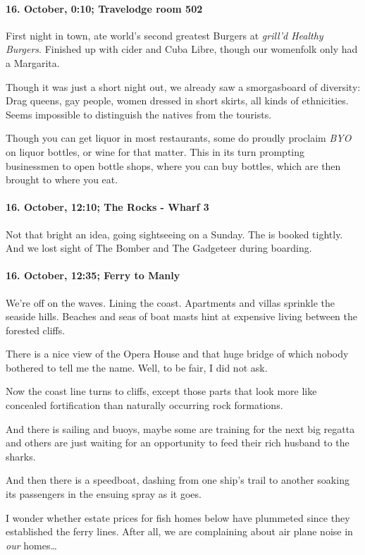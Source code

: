 \paragraph{16. October, 0:10; Travelodge room 502}
First night in town, ate world's second greatest Burgers at \emph{grill'd Healthy Burgers}.
Finished up with cider and Cuba Libre, though our womenfolk only had a Margarita.

Though it was just a short night out, we already saw a smorgasboard of diversity:
Drag queens, gay people, women dressed in short skirts, all kinds of ethnicities.
Seems impossible to distinguish the natives from the tourists.

Though you can get liquor in most restaurants, some do proudly proclaim \emph{BYO} on liquor bottles, or wine for that matter.
This in its turn prompting businessmen to open bottle shops, where you can buy bottles, which are then brought to where you eat.

\paragraph{16. October, 12:10; The Rocks - Wharf 3}
Not that bright an idea, going sightseeing on a Sunday.
The is booked tightly.
And we lost sight of The Bomber and The Gadgeteer during boarding.

\paragraph{16. October, 12:35; Ferry to Manly}
We're off on the waves.
Lining the coast.
Apartments and villas sprinkle the seaside hills.
Beaches and seas of boat masts hint at expensive living between the forested cliffs.

There is a nice view of the Opera House and that huge bridge of which nobody bothered to tell me the name.
Well, to be fair, I did not ask.

Now the coast line turns to cliffs, except those parts that look more like concealed fortification than naturally occurring rock formations.

And there is sailing and buoys, maybe some are training for the next big regatta and others are just waiting for an opportunity to feed their rich husband to the sharks.

And then there is a speedboat, dashing from one ship's trail to another soaking its passengers in the ensuing spray as it goes.

I wonder whether estate prices for fish homes below have plummeted since they established the ferry lines.
After all, we are complaining about air plane noise in \emph{our} homes\ldots{}

